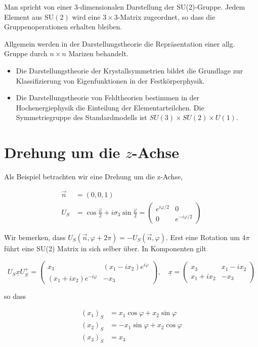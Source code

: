 \documentclass[10pt, letterpaper]{article}
\begin{document}
Man spricht von einer 3-dimensionalen Darstellung der SU(2)-Gruppe. Jedem Element aus $\mathrm{SU}(2)$ wird eine $3 \times 3$-Matrix zugeordnet, so dass die Gruppenoperationen erhalten bleiben.

Allgemein werden in der Darstellungstheorie die Repräsentation einer allg. Gruppe durch $n \times n$ Marizen behandelt.

\begin{itemize}
  \item Die Darstellungstheorie der Krystallsymmetrien bildet die Grundlage zur Klassifizierung von Eigenfunktionen in der Festkörperphysik.
  \item Die Darstellungstheorie von Feldtheorien bestimmen in der Hochenergiephysik die Einteilung der Elementarteilchen. Die Symmetriegruppe des Standardmodells ist $S U(3) \times S U(2) \times U(1)$.
\end{itemize}

\section*{Drehung um die $z$-Achse}
Als Beispiel betrachten wir eine Drehung um die z-Achse,

$$
\begin{aligned}
\vec{n} & =(0,0,1) \\
U_{S} & =\cos \frac{\varphi}{2}+i \sigma_{3} \sin \frac{\varphi}{2}=\left(\begin{array}{cc}
e^{i \varphi / 2} & 0 \\
0 & e^{-i \varphi / 2}
\end{array}\right)
\end{aligned}
$$

Wir bemerken, dass $U_{S}(\vec{n}, \varphi+2 \pi)=-U_{S}(\vec{n}, \varphi)$. Erst eine Rotation um $4 \pi$ führt eine SU(2) Matrix in sich selber über. In Komponenten gilt

$$
U_{S} \underline{x} U_{S}^{+}=\left(\begin{array}{cc}
x_{3} & \left(x_{1}-i x_{2}\right) e^{i \varphi} \\
\left(x_{1}+i x_{2}\right) e^{-i \varphi} & -x_{3}
\end{array}\right), \quad \underline{x}=\left(\begin{array}{cc}
x_{3} & x_{1}-i x_{2} \\
x_{1}+i x_{2} & -x_{3}
\end{array}\right)
$$

so dass

$$
\begin{aligned}
\left(x_{1}\right)_{S} & =x_{1} \cos \varphi+x_{2} \sin \varphi \\
\left(x_{2}\right)_{S} & =-x_{1} \sin \varphi+x_{2} \cos \varphi \\
\left(x_{3}\right)_{S} & =x_{3}
\end{aligned}
$$
\end{document}
